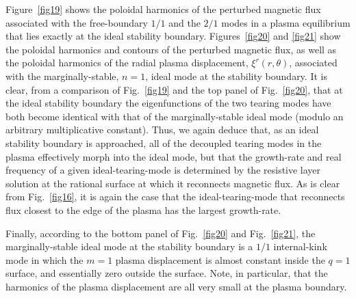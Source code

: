 \documentclass[12pt,prb,aps]{revtex4-1}
\begin{document}
Figure~\ref{fig19} shows the poloidal harmonics of the perturbed magnetic flux associated
with the free-boundary $1/1$ and the $2/1$ modes  in a  plasma equilibrium 
that lies exactly at the ideal stability boundary. Figures~\ref{fig20} and \ref{fig21} show the poloidal harmonics and contours of the perturbed magnetic flux, as well
as the poloidal harmonics of the radial
plasma displacement, $\xi^r(r,\theta)$, associated with the marginally-stable, $n=1$, ideal mode at the stability boundary. It is
clear, from a comparison of Fig.~\ref{fig19} and the top panel of Fig.~\ref{fig20}, that at the ideal stability boundary the eigenfunctions of the two
tearing modes have both become identical with that of the marginally-stable ideal mode (modulo an arbitrary multiplicative constant). Thus, we again deduce that, as
an ideal stability boundary is approached, all of the decoupled tearing modes in the plasma 
effectively morph into the ideal mode, but that the growth-rate and real frequency of a given ideal-tearing-mode is determined by the 
resistive layer solution at the rational surface at which it reconnects magnetic flux. As is clear from Fig.~\ref{fig16}, it is again the case that the ideal-tearing-mode that reconnects flux closest to the edge of the plasma has the largest growth-rate. 

Finally, according to the bottom panel of Fig.~\ref{fig20} and Fig.~\ref{fig21}, the marginally-stable ideal mode at the stability boundary is a $1/1$
internal-kink mode in which the $m=1$ plasma displacement is almost constant inside the $q=1$ surface, and essentially zero
outside the surface.\cite{freidberg,wesson} Note, in particular, that the harmonics of the plasma displacement are all very small at the 
plasma boundary.
\end{document}
